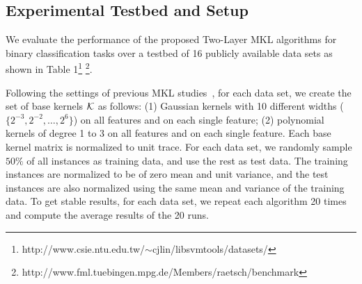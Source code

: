 \subsection{Experimental Testbed and Setup}
We evaluate the performance of the proposed Two-Layer MKL algorithms for binary classification tasks over a testbed of 16 publicly available data sets as shown in Table 1\footnote{\scriptsize http://www.csie.ntu.edu.tw/$\sim$cjlin/libsvmtools/datasets/}
\footnote{\scriptsize http://www.fml.tuebingen.mpg.de/Members/raetsch/benchmark}.


Following the settings of previous MKL studies~\cite{nips/XuJKL08}, for each data set, we create the set of base kernels ${\mathcal K}$ as follows: %
(1) Gaussian kernels with 10 different widths ($\{2^{-3},2^{-2},\ldots,2^6\}$) on all features and on each single feature; (2) polynomial kernels of degree 1 to 3 on all features and on each single feature. Each base kernel matrix is normalized to unit trace.
For each data set, we randomly sample $50\%$ of all instances as training data, and
use the rest as test data. The training instances are normalized to be of zero mean and
unit variance, and the test instances are also normalized using the same mean and
variance of the training data. To get stable results, for each data set, we repeat each
algorithm 20 times and compute the average results of the 20 runs.

